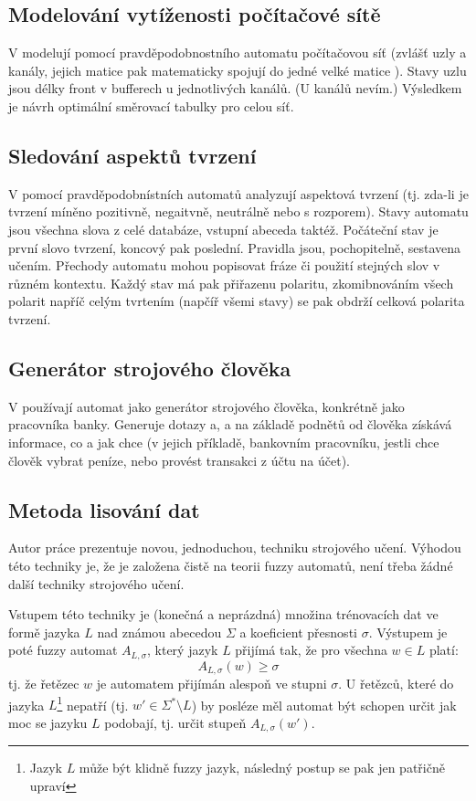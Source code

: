 \documentclass[a4paper,10pt]{article}
\begin{document}
\subsection{Modelování vytíženosti počítačové sítě}

V \cite{Niz-ModComComNetViaPrAu} modelují pomocí pravděpodobnostního automatu počítačovou síť (zvlášť uzly a kanály, jejich matice pak matematicky spojují do jedné velké matice ). Stavy uzlu jsou délky front v bufferech u jednotlivých kanálů. (U kanálů nevím.) Výsledkem je návrh optimální směrovací tabulky pro celou síť. 

\subsection{Sledování aspektů tvrzení}
V \cite{Cas+-ProAutAspBasSenAna} pomocí pravděpodobnístních automatů analyzují aspektová tvrzení (tj. zda-li je tvrzení míněno pozitivně, negaitvně, neutrálně nebo s rozporem). Stavy automatu jsou všechna slova z celé databáze, vstupní abeceda taktéž. Počáteční stav je první slovo tvrzení, koncový pak poslední. Pravidla jsou, pochopitelně, sestavena učením. Přechody automatu mohou popisovat fráze či použití stejných slov v různém kontextu. Každý stav má pak přiřazenu polaritu, zkomibnováním všech polarit napříč celým tvrtením (napčíř všemi stavy) se pak obdrží celková polarita tvrzení.

\subsection{Generátor strojového člověka}
V \cite{SchYou-ProSimHumMacDia} používají automat jako generátor strojového člověka, konkrétně jako pracovníka banky. Generuje dotazy a, a na základě podnětů od člověka získává informace, co a jak chce (v jejich příkladě, bankovním pracovníku, jestli chce člověk vybrat peníze, nebo provést transakci z účtu na účet). 


\subsection{Metoda lisování dat}
Autor práce prezentuje novou, jednoduchou, techniku strojového učení. Výhodou této techniky je, že je založena čistě na teorii fuzzy automatů, není třeba žádné další techniky strojového učení.

Vstupem této techniky je (konečná a neprázdná) množina trénovacích dat ve formě jazyka $L$ nad známou abecedou $\Sigma$ a koeficient přesnosti $\sigma$. Výstupem je poté fuzzy automat $A_{L,\sigma}$, který jazyk $L$ přijímá tak, že pro všechna $w \in L$ platí:
$$
  A_{L,\sigma}(w) \geq \sigma
$$
tj. že řetězec $w$ je automatem přijímán alespoň ve stupni $\sigma$. U řetězců, které do jazyka $L$\footnote{Jazyk $L$ může být klidně fuzzy jazyk, následný postup se pak jen patřičně upraví} nepatří (tj. $w' \in \Sigma^* \setminus L$) by posléze měl automat být schopen určit jak moc se jazyku $L$ podobají, tj. určit stupeň $A_{L,\sigma}(w')$.
\end{document}
